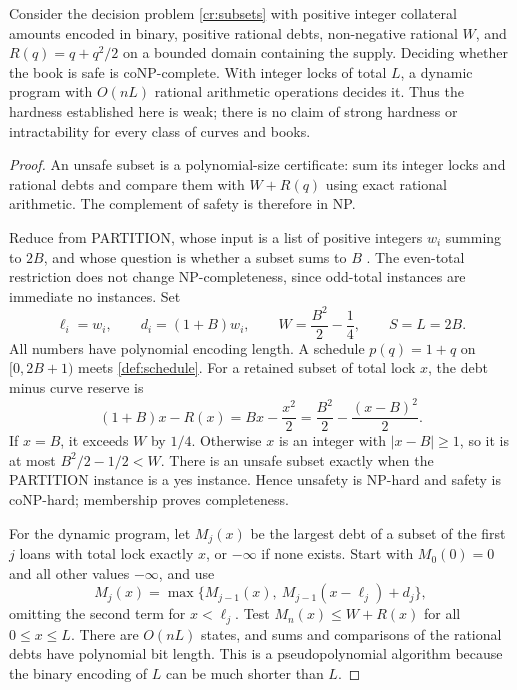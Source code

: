 \begin{samepage}
\begin{proposition}\label{cr:hardness}
Consider the decision problem \eqref{cr:subsets} with positive integer collateral amounts encoded in binary, positive rational debts, non-negative rational $W$, and $R(q)=q+q^2/2$ on a bounded domain containing the supply. Deciding whether the book is safe is coNP-complete. With integer locks of total $L$, a dynamic program with $O(nL)$ rational arithmetic operations decides it. Thus the hardness established here is weak; there is no claim of strong hardness or intractability for every class of curves and books.
\end{proposition}
\end{samepage}
\begin{proof}
An unsafe subset is a polynomial-size certificate: sum its integer locks and rational debts and compare them with $W+R(q)$ using exact rational arithmetic. The complement of safety is therefore in NP.

Reduce from PARTITION, whose input is a list of positive integers $w_i$ summing to $2B$, and whose question is whether a subset sums to $B$ \citep{karp1972}. The even-total restriction does not change NP-completeness, since odd-total instances are immediate no instances. Set
\[
\ell_i=w_i,\qquad d_i=(1+B)w_i,\qquad
W=\frac{B^2}{2}-\frac14,\qquad S=L=2B.
\]
All numbers have polynomial encoding length. A schedule $p(q)=1+q$ on $[0,2B+1)$ meets \cref{def:schedule}. For a retained subset of total lock $x$, the debt minus curve reserve is
\begin{equation}\label{cr:partitiondeficit}
(1+B)x-R(x)=Bx-\frac{x^2}{2}
=\frac{B^2}{2}-\frac{(x-B)^2}{2}.
\end{equation}
If $x=B$, it exceeds $W$ by $1/4$. Otherwise $x$ is an integer with $|x-B|\ge1$, so it is at most $B^2/2-1/2<W$. There is an unsafe subset exactly when the PARTITION instance is a yes instance. Hence unsafety is NP-hard and safety is coNP-hard; membership proves completeness.

For the dynamic program, let $M_j(x)$ be the largest debt of a subset of the first $j$ loans with total lock exactly $x$, or $-\infty$ if none exists. Start with $M_0(0)=0$ and all other values $-\infty$, and use
\[
M_j(x)=\max\{M_{j-1}(x),\ M_{j-1}(x-\ell_j)+d_j\},
\]
omitting the second term for $x<\ell_j$. Test $M_n(x)\le W+R(x)$ for all $0\le x\le L$. There are $O(nL)$ states, and sums and comparisons of the rational debts have polynomial bit length. This is a pseudopolynomial algorithm because the binary encoding of $L$ can be much shorter than $L$.
\end{proof}

